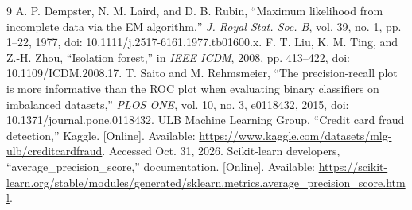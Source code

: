 \documentclass[conference]{IEEEtran}
\begin{document}
\begin{thebibliography}{9}
 A. P. Dempster, N. M. Laird, and D. B. Rubin, ``Maximum likelihood from incomplete data via the EM algorithm,'' \emph{J. Royal Stat. Soc. B}, vol. 39, no. 1, pp. 1--22, 1977, doi: 10.1111/j.2517-6161.1977.tb01600.x.
 F. T. Liu, K. M. Ting, and Z.-H. Zhou, ``Isolation forest,'' in \emph{IEEE ICDM}, 2008, pp. 413--422, doi: 10.1109/ICDM.2008.17.
 T. Saito and M. Rehmsmeier, ``The precision-recall plot is more informative than the ROC plot when evaluating binary classifiers on imbalanced datasets,'' \emph{PLOS ONE}, vol. 10, no. 3, e0118432, 2015, doi: 10.1371/journal.pone.0118432.
 ULB Machine Learning Group, ``Credit card fraud detection,'' Kaggle. [Online]. Available: \url{https://www.kaggle.com/datasets/mlg-ulb/creditcardfraud}. Accessed Oct. 31, 2026.
 Scikit-learn developers, ``average\_precision\_score,'' documentation. [Online]. Available: \url{https://scikit-learn.org/stable/modules/generated/sklearn.metrics.average_precision_score.html}.
\end{thebibliography}
\end{document}
